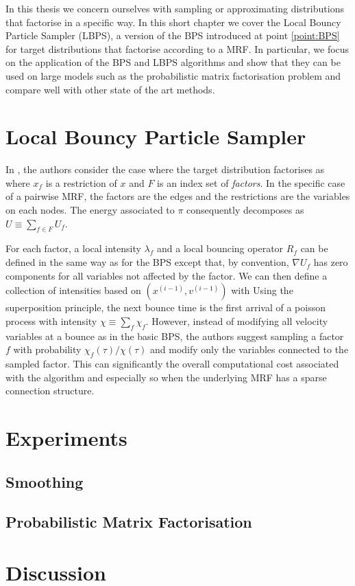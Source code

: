 
In this thesis we concern ourselves with sampling or approximating distributions that factorise in a specific way. In this short chapter we cover the Local Bouncy Particle Sampler (LBPS), a version of the BPS introduced at point \ref{point:BPS} for target distributions that factorise according to a MRF. In particular, we focus on the application of the BPS and LBPS algorithms and show that they can be used on large models such as the probabilistic matrix factorisation problem and compare well with other state of the art methods.

\section{Local Bouncy Particle Sampler}
In \cite{bouchard15}, the authors consider the case where the target distribution factorises as
%
%
where $x_{f}$ is a restriction of $x$ and $F$ is an index set of \emph{factors}. In the specific case of a pairwise MRF, the factors are the edges and the restrictions are the variables on each nodes. The energy associated to $\pi$ consequently decomposes as $U\equiv \sum_{f\in F}U_{f}$.

For each factor, a local intensity $\lambda_{f}$ and a local bouncing operator $R_{f}$ can be defined in the same way as for the BPS except that, by convention, $\nabla U_{f}$ has zero components for all variables not affected by the factor. We can then define a collection of intensities based on $(x^{(i-1)},v^{(i-1)})$ with
%
%
Using the superposition principle, the next bounce time is the first arrival of a poisson process with intensity $\chi\equiv\sum_{f} \chi_{f}$. However, instead of modifying all velocity variables at a bounce as in the basic BPS, the authors suggest sampling a factor $f$ with probability $\chi_{f}(\tau)/\chi(\tau)$ and modify only the variables connected to the sampled factor. This can significantly the overall computational cost associated with the algorithm and especially so when the underlying MRF has a sparse connection structure.

\section{Experiments}

\subsection{Smoothing}

\subsection{Probabilistic Matrix Factorisation}

\section{Discussion}










